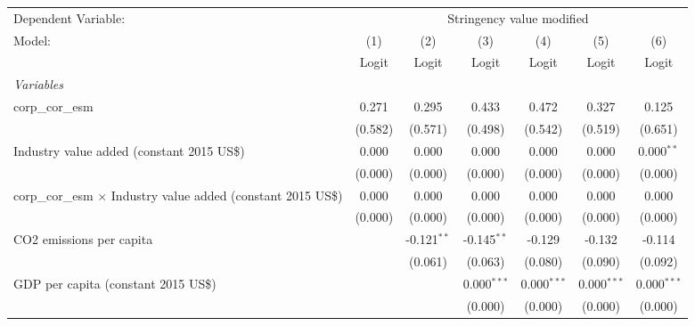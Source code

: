 
\begingroup
\centering
\begin{tabular}{lcccccc}
   \toprule
   Dependent Variable: & \multicolumn{6}{c}{Stringency value modified}\\
   Model:                                                                & (1)     & (2)           & (3)           & (4)           & (5)           & (6)\\  
                                                                         &  Logit  & Logit         & Logit         & Logit         & Logit         & Logit\\  
   \midrule
   \emph{Variables}\\
   corp\_cor\_esm                                                        & 0.271   & 0.295         & 0.433         & 0.472         & 0.327         & 0.125\\   
                                                                         & (0.582) & (0.571)       & (0.498)       & (0.542)       & (0.519)       & (0.651)\\   
   Industry value added (constant 2015 US\$)                             & 0.000   & 0.000         & 0.000         & 0.000         & 0.000         & 0.000$^{**}$\\   
                                                                         & (0.000) & (0.000)       & (0.000)       & (0.000)       & (0.000)       & (0.000)\\   
   corp\_cor\_esm $\times$ Industry value added (constant 2015 US\$)     & 0.000   & 0.000         & 0.000         & 0.000         & 0.000         & 0.000\\   
                                                                         & (0.000) & (0.000)       & (0.000)       & (0.000)       & (0.000)       & (0.000)\\   
   CO2 emissions per capita                                              &         & -0.121$^{**}$ & -0.145$^{**}$ & -0.129        & -0.132        & -0.114\\   
                                                                         &         & (0.061)       & (0.063)       & (0.080)       & (0.090)       & (0.092)\\   
   GDP per capita (constant 2015 US\$)                                   &         &               & 0.000$^{***}$ & 0.000$^{***}$ & 0.000$^{***}$ & 0.000$^{***}$\\   
                                                                         &         &               & (0.000)       & (0.000)       & (0.000)       & (0.000)\\   

\end{tabular}

